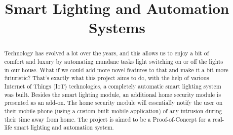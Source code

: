 \documentclass[conference]{IEEEtran}
\begin{document}
\title{Smart Lighting and Automation Systems\\}

\author{
\and
{}
\and
{}
\and
{}
\and
{}
\and
{}
}


\maketitle

\begin{abstract}
Technology has evolved a lot over the years, and this allows us to enjoy a bit of comfort and luxury by automating mundane tasks light switching on or off the lights in our house. What if we could add more novel features to that and make it a bit more futuristic? That’s exactly what this project aims to do, with the help of various Internet of Things (IoT) technologies, a completely automatic smart lighting system was built. Besides the smart lighting module, an additional home security module is presented as an add-on. The home security module will essentially notify the user on their mobile phone (using a custom-built mobile application) of any intrusion during their time away from home. The project is aimed to be a Proof-of-Concept for a real-life smart lighting and automation system.
\end{abstract}
\end{document}
